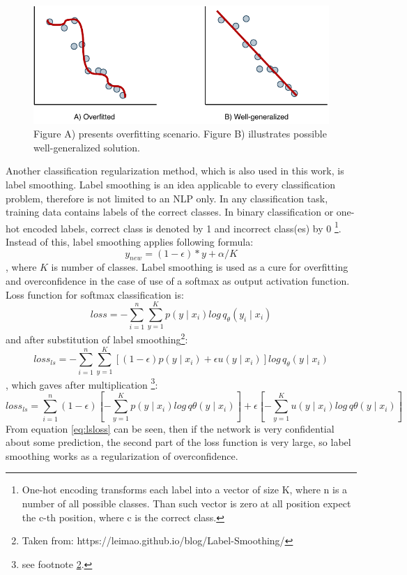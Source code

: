 \begin{figure}[h]
\centering
\includegraphics[width=0.7\columnwidth]{../img/overfitting}
\caption{Figure A) presents overfitting scenario. Figure B) illustrates possible well-generalized solution. }
\label{pic:overfitting}
\end{figure}
Another classification regularization method, which is also used in this work, is label smoothing. Label smoothing \citep{Szegedy2015} is an idea applicable to every classification problem, therefore is not limited to an NLP only.
In any classification task, training data contains labels of the correct classes. In binary classification or one-hot encoded labels, correct class is denoted by 1 and incorrect class(es) by 0 \footnote{One-hot encoding transforms each label into a vector of size K, where n is a number of all possible classes. Than such vector is zero at all position expect the c-th position, where c is the correct class.}. Instead of this, label smoothing applies following formula: 
$$y_{new} = (1 - \epsilon) * y + \alpha / K$$, where $K$ is number of classes. Label smoothing is used as a cure for overfitting and overconfidence in the case of use of a softmax 
 as output activation function. Loss function for softmax classification is: 
 $$ loss = -\sum_{i=1}^{n} \sum_{y=1}^{K} p(y \mid x_i) log \, q_{\theta} ( y_i \mid x_i ) $$
 and after substitution of label smoothing\footnote{\label{note1} Taken from: https://leimao.github.io/blog/Label-Smoothing/}:
$$
loss_{ls} = -\sum_{i=1}^{n} \sum_{y=1}^{K} [(1-\epsilon) p(y \mid x_i)+\epsilon u(y\mid x_i)]log \, q_\theta(y \mid x_i) $$,
which gaves after multiplication \footnote{see footnote \ref{note1}.}:
 \begin{equation} \label{eq:lsloss}
 loss_{ls}= \sum_{i=1}^{n} {(1- \epsilon)[- \sum_{y=1}^{K} p(y\mid x_i) log \, q\theta(y \mid x_i)]+\epsilon [- \sum_{y=1}^{K} u(y \mid x_i)log \, q\theta (y\mid x_i)]}
 \end{equation}
From equation \ref{eq:lsloss} can be seen, then if the network is very confidential about some prediction, the second part of the loss function is very large, so label smoothing works as a regularization of overconfidence.

